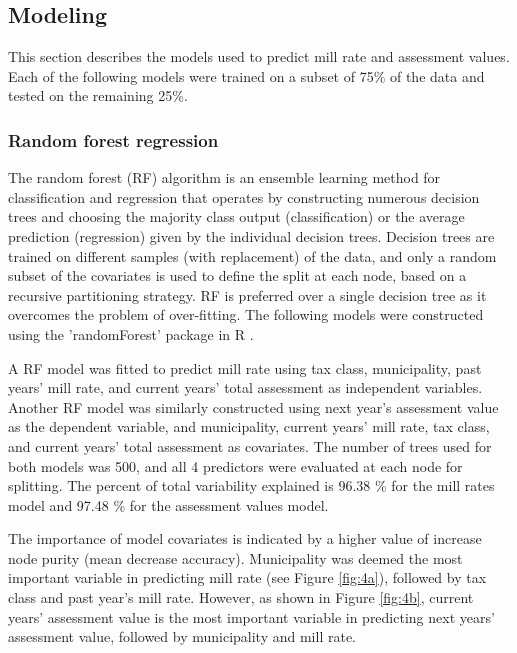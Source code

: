 \documentclass{article}
\begin{document}
\FloatBarrier


\subsection{Modeling} \label{section:model}

This section describes the models used to predict mill rate and assessment values. Each of the following models were trained on a subset of 75\% of the data and tested on the remaining 25\%.

\subsubsection{Random forest regression}

The random forest (RF) algorithm is an ensemble learning method for classification and regression that operates by constructing numerous decision trees and choosing the majority class output (classification) or the average prediction (regression) given by the individual decision trees. Decision trees are trained on different samples (with replacement) of the data, and only a random subset of the covariates is used to define the split at each node, based on a recursive partitioning strategy. RF is preferred over a single decision tree as it overcomes the problem of over-fitting.  The following models were constructed using the 'randomForest' package in R \citep{rfpack}.

A RF model was fitted to predict mill rate using tax class, municipality, past years' mill rate, and current years' total assessment as independent variables. Another RF model was similarly constructed using next year's assessment value as the dependent variable, and municipality, current years' mill rate, tax class, and current years' total assessment as covariates. The number of trees used for both models was 500, and all 4 predictors were evaluated at each node for splitting. The percent of total variability explained is 96.38 \% for the mill rates model and 97.48 \% for the assessment values model. 

The importance of model covariates is indicated by a higher value of increase node purity (mean decrease accuracy). Municipality was deemed the most important variable in predicting mill rate (see Figure \ref{fig:4a}), followed by tax class and past year's mill rate. However, as shown in Figure  \ref{fig:4b}, current years' assessment value is the most important variable in predicting next years' assessment value, followed by municipality and mill rate.
\end{document}
